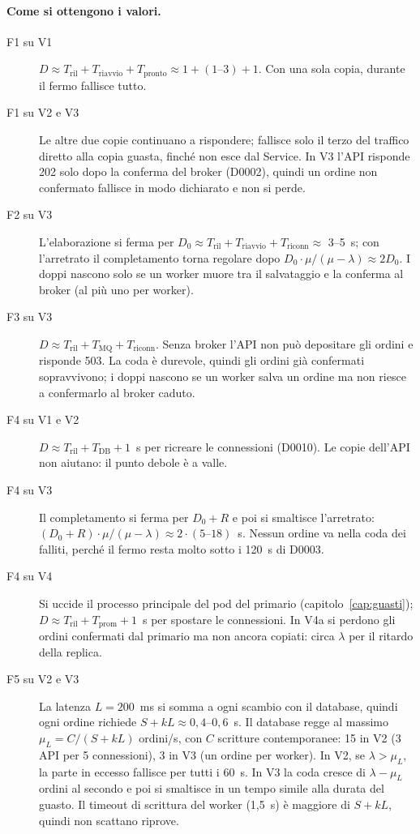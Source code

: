\paragraph{Come si ottengono i valori.}
\begin{description}
  \item[F1 su V1] $D \approx T_{\text{ril}} + T_{\text{riavvio}} + T_{\text{pronto}} \approx 1 + (1\text{--}3) + 1$. Con una sola copia, durante il fermo fallisce tutto.
  \item[F1 su V2 e V3] Le altre due copie continuano a rispondere; fallisce solo il terzo del traffico diretto alla copia guasta, finché non esce dal Service. In V3 l'API risponde 202 solo dopo la conferma del broker (D0002), quindi un ordine non confermato fallisce in modo dichiarato e non si perde.
  \item[F2 su V3] L'elaborazione si ferma per $D_0 \approx T_{\text{ril}} + T_{\text{riavvio}} + T_{\text{riconn}} \approx$ 3--5~s; con l'arretrato il completamento torna regolare dopo $D_0 \cdot \mu/(\mu - \lambda) \approx 2 D_0$. I doppi nascono solo se un worker muore tra il salvataggio e la conferma al broker (al più uno per worker).
  \item[F3 su V3] $D \approx T_{\text{ril}} + T_{\text{MQ}} + T_{\text{riconn}}$. Senza broker l'API non può depositare gli ordini e risponde 503. La coda è durevole, quindi gli ordini già confermati sopravvivono; i doppi nascono se un worker salva un ordine ma non riesce a confermarlo al broker caduto.
  \item[F4 su V1 e V2] $D \approx T_{\text{ril}} + T_{\text{DB}} + 1$~s per ricreare le connessioni (D0010). Le copie dell'API non aiutano: il punto debole è a valle.
  \item[F4 su V3] Il completamento si ferma per $D_0 + R$ e poi si smaltisce l'arretrato: $(D_0 + R) \cdot \mu/(\mu - \lambda) \approx 2 \cdot (5\text{--}18)$~s. Nessun ordine va nella coda dei falliti, perché il fermo resta molto sotto i 120~s di D0003.
  \item[F4 su V4] Si uccide il processo principale del pod del primario (capitolo~\ref{cap:guasti}); $D \approx T_{\text{ril}} + T_{\text{prom}} + 1$~s per spostare le connessioni. In V4a si perdono gli ordini confermati dal primario ma non ancora copiati: circa $\lambda$ per il ritardo della replica.
  \item[F5 su V2 e V3] La latenza $L = 200$~ms si somma a ogni scambio con il database, quindi ogni ordine richiede $S + kL \approx 0{,}4$--$0{,}6$~s. Il database regge al massimo $\mu_L = C / (S + kL)$ ordini/s, con $C$ scritture contemporanee: 15 in V2 (3 API per 5 connessioni), 3 in V3 (un ordine per worker). In V2, se $\lambda > \mu_L$, la parte in eccesso fallisce per tutti i 60~s. In V3 la coda cresce di $\lambda - \mu_L$ ordini al secondo e poi si smaltisce in un tempo simile alla durata del guasto. Il timeout di scrittura del worker (1,5~s) è maggiore di $S + kL$, quindi non scattano riprove.

\end{description}
